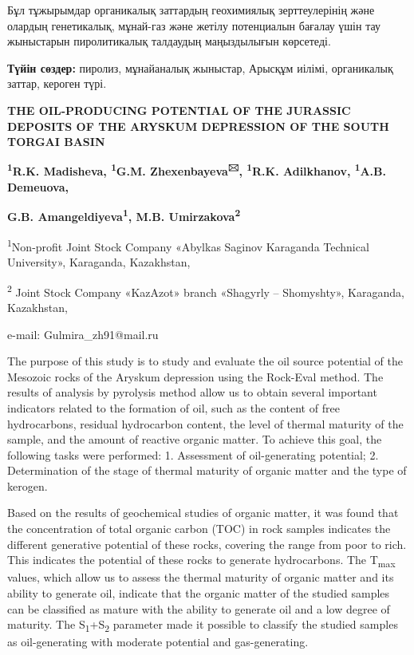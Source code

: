 Бұл тұжырымдар органикалық заттардың геохимиялық зерттеулерінің және
олардың генетикалық, мұнай-газ және жетілу потенциалын бағалау үшін тау
жыныстарын пиролитикалық талдаудың маңыздылығын көрсетеді.

{\bfseries Түйін сөздер:} пиролиз, мұнайаналық жыныстар, Арысқұм иілімі,
органикалық заттар, кероген түрі.

\begin{center}
{\large\bfseries THE OIL-PRODUCING POTENTIAL OF THE JURASSIC DEPOSITS OF THE
ARYSKUM DEPRESSION OF THE SOUTH TORGAI BASIN}

{\bfseries \textsuperscript{1}R.K. Madisheva, \textsuperscript{1}G.M.
Zhexenbayeva\textsuperscript{🖂}, \textsuperscript{1}R.K. Adilkhanov,
\textsuperscript{1}A.B. Demeuova,}

{\bfseries G.B. Amangeldiyeva\textsuperscript{1}, M.B.
Umirzakova\textsuperscript{2}}

\textsuperscript{1}Non-profit Joint Stock Company «Abylkas Saginov
Karaganda Technical University», Karaganda, Kazakhstan,

\textsuperscript{2} Joint Stock Company «KazAzot» branch «Shagyrly --
Shomyshty», Karaganda, Kazakhstan,

e-mail: Gulmira\_zh91@mail.ru
\end{center}

The purpose of this study is to study and evaluate the oil source
potential of the Mesozoic rocks of the Aryskum depression using the
Rock-Eval method. The results of analysis by pyrolysis method allow us
to obtain several important indicators related to the formation of oil,
such as the content of free hydrocarbons, residual hydrocarbon content,
the level of thermal maturity of the sample, and the amount of reactive
organic matter. To achieve this goal, the following tasks were
performed: 1. Assessment of oil-generating potential; 2. Determination
of the stage of thermal maturity of organic matter and the type of
kerogen.

Based on the results of geochemical studies of organic matter, it was
found that the concentration of total organic carbon (TOC) in rock
samples indicates the different generative potential of these rocks,
covering the range from poor to rich. This indicates the potential of
these rocks to generate hydrocarbons. The T\textsubscript{max} values,
which allow us to assess the thermal maturity of organic matter and its
ability to generate oil, indicate that the organic matter of the studied
samples can be classified as mature with the ability to generate oil and
a low degree of maturity. The S\textsubscript{1}+S\textsubscript{2}
parameter made it possible to classify the studied samples as
oil-generating with moderate potential and gas-generating.

